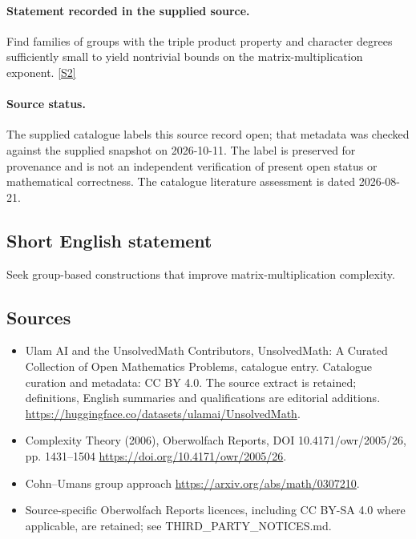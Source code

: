 \documentclass[11pt]{article}
\newcommand{\sref}[2]{\hyperlink{source:#1:#2}{[S#2]}}
\begin{document}
\paragraph{Statement recorded in the supplied source.}
Find families of groups with the triple product property and character degrees sufficiently small to yield nontrivial bounds on the matrix-multiplication exponent. \sref{statement}{2}
\paragraph{Source status.}
The supplied catalogue labels this source record open; that metadata was checked against the supplied snapshot on 2026-10-11. The label is preserved for provenance and is not an independent verification of present open status or mathematical correctness. The catalogue literature assessment is dated 2026-08-21.
\subsection{Short English statement}
Seek group-based constructions that improve matrix-multiplication complexity.
\subsection{Sources}
\begin{itemize}
\item[\hypertarget{source:statement:1}{S1}] Ulam AI and the UnsolvedMath Contributors, UnsolvedMath: A Curated Collection of Open Mathematics Problems, catalogue entry. Catalogue curation and metadata: CC BY 4.0. The source extract is retained; definitions, English summaries and qualifications are editorial additions.
\url{https://huggingface.co/datasets/ulamai/UnsolvedMath}.
\item[\hypertarget{source:statement:2}{S2}] Complexity Theory (2006), Oberwolfach Reports, DOI 10.4171/owr/2005/26, pp. 1431--1504
\url{https://doi.org/10.4171/owr/2005/26}.
\item[\hypertarget{source:statement:3}{S3}] Cohn--Umans group approach
\url{https://arxiv.org/abs/math/0307210}.
\item Source-specific Oberwolfach Reports licences, including CC BY-SA 4.0 where applicable, are retained; see THIRD\_PARTY\_NOTICES.md.
\end{itemize}
\end{document}
